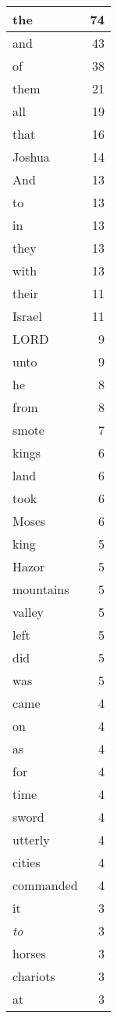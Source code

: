 \begin{center}
\begin{longtable}{l|r}
\hline \hline
\endlastfoot
the & 74 \\ \hline
and & 43 \\ \hline
of & 38 \\ \hline
them & 21 \\ \hline
all & 19 \\ \hline
that & 16 \\ \hline
Joshua & 14 \\ \hline
And & 13 \\ \hline
to & 13 \\ \hline
in & 13 \\ \hline
they & 13 \\ \hline
with & 13 \\ \hline
their & 11 \\ \hline
Israel & 11 \\ \hline
LORD & 9 \\ \hline
unto & 9 \\ \hline
he & 8 \\ \hline
from & 8 \\ \hline
smote & 7 \\ \hline
kings & 6 \\ \hline
land & 6 \\ \hline
took & 6 \\ \hline
Moses & 6 \\ \hline
king & 5 \\ \hline
Hazor & 5 \\ \hline
mountains & 5 \\ \hline
valley & 5 \\ \hline
left & 5 \\ \hline
did & 5 \\ \hline
was & 5 \\ \hline
came & 4 \\ \hline
on & 4 \\ \hline
as & 4 \\ \hline
for & 4 \\ \hline
time & 4 \\ \hline
sword & 4 \\ \hline
utterly & 4 \\ \hline
cities & 4 \\ \hline
commanded & 4 \\ \hline
it & 3 \\ \hline
\emph{to} & 3 \\ \hline
horses & 3 \\ \hline
chariots & 3 \\ \hline
at & 3 \\ \hline

\end{longtable}
\end{center}
